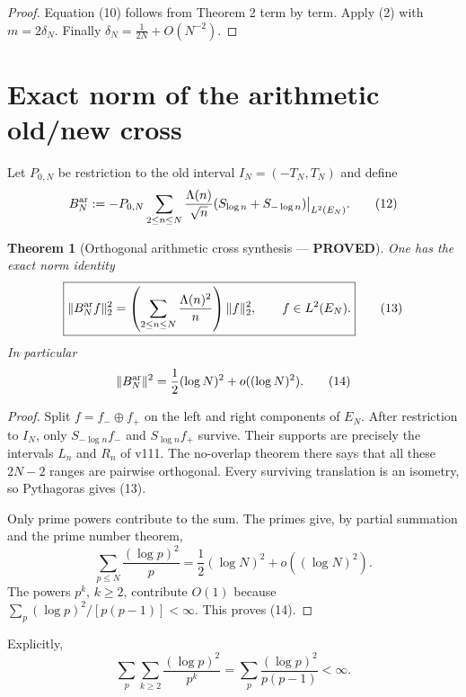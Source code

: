 \documentclass[11pt]{article}
\newcommand{\PROVED}{\textcolor{green!40!black}{\textbf{PROVED}}}
\newtheorem{theorem}{Theorem}
\begin{document}
\begin{proof}
Equation (10) follows from Theorem 2 term by term.  Apply (2) with
$m=2\delta_N$.  Finally
$\delta_N=\frac1{2N}+O(N^{-2})$.
\end{proof}

\section{Exact norm of the arithmetic old/new cross}

Let $P_{0,N}$ be restriction to the old interval $I_N=(-T_N,T_N)$ and
define
\begin{equation}
 B_N^{\rm ar}:=-P_{0,N}\sum_{2\le n\le N}
       \frac{\Lambda(n)}{\sqrt n}(S_{\log n}+S_{-\log n})
       \big|_{L^2(E_N)}.                                    \tag{12}
\end{equation}

\begin{theorem}[Orthogonal arithmetic cross synthesis --- \PROVED]
One has the exact norm identity
\begin{equation}
 \boxed{
 \|B_N^{\rm ar}f\|_2^2
 =\left(\sum_{2\le n\le N}\frac{\Lambda(n)^2}{n}\right)
   \|f\|_2^2,\qquad f\in L^2(E_N).}                         \tag{13}
\end{equation}
In particular
\begin{equation}
 \|B_N^{\rm ar}\|^2
 =\frac12(\log N)^2+o((\log N)^2).                          \tag{14}
\end{equation}
\end{theorem}

\begin{proof}
Split $f=f_-\oplus f_+$ on the left and right components of $E_N$.
After restriction to $I_N$, only $S_{-\log n}f_-$ and
$S_{\log n}f_+$ survive.  Their supports are precisely the intervals
$L_n$ and $R_n$ of v111.  The no-overlap theorem there says that all these
$2N-2$ ranges are pairwise orthogonal.  Every surviving translation is an
isometry, so Pythagoras gives (13).

Only prime powers contribute to the sum.  The primes give, by partial
summation and the prime number theorem,
\[
 \sum_{p\le N}\frac{(\log p)^2}{p}
 =\frac12(\log N)^2+o((\log N)^2).
\]
The powers $p^k$, $k\ge2$, contribute $O(1)$ because
$\sum_p(\log p)^2/[p(p-1)]<\infty$.  This proves (14).
\end{proof}

Explicitly,
\[
 \sum_p\sum_{k\ge2}\frac{(\log p)^2}{p^k}
 =\sum_p\frac{(\log p)^2}{p(p-1)}<\infty.                   \tag{15}
\]
\end{document}
